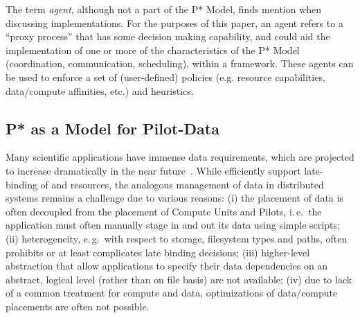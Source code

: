 \documentclass[conference]{IEEEtran}
\begin{document}

The term {\it agent}, although not a part of the P* Model, finds
mention when discussing implementations. For the purposes of this
paper, an agent refers to a ``proxy process'' 
that has some decision making capability, and could aid the
implementation of one or more of the characteristics of the P* Model
(coordination, communication, scheduling), within a \pilotjob
framework.  These agents can be used to enforce a set of
(user-defined) policies (e.g.  resource capabilities, data/compute
affinities, etc.) and heuristics.




\subsection{P* as a Model for Pilot-Data}
\label{sec:pilot-data}




Many scientific applications have immense data requirements, which are
projected to increase dramatically in the near future~\cite{hey2009}. 
While \pilotjobs efficiently support late-binding of
\I{\computeunits} and resources, the analogous management of data in
distributed systems remains a challenge due to various reasons: (i) the
placement of data is often decoupled from the placement of Compute Units and
Pilots, i.\,e.\ the application must often manually stage in and out its data
using simple scripts; (ii) heterogeneity, e.\,g.\ with respect to storage,
filesystem types and paths, often prohibits or at least complicates late
binding decisions; (iii) higher-level abstraction that allow applications to
specify their data dependencies on an abstract, logical level (rather than on
file basis) are not available; (iv) due to lack of a common treatment for
compute and data, optimizations of data/compute placements are often not
possible.
\end{document}
